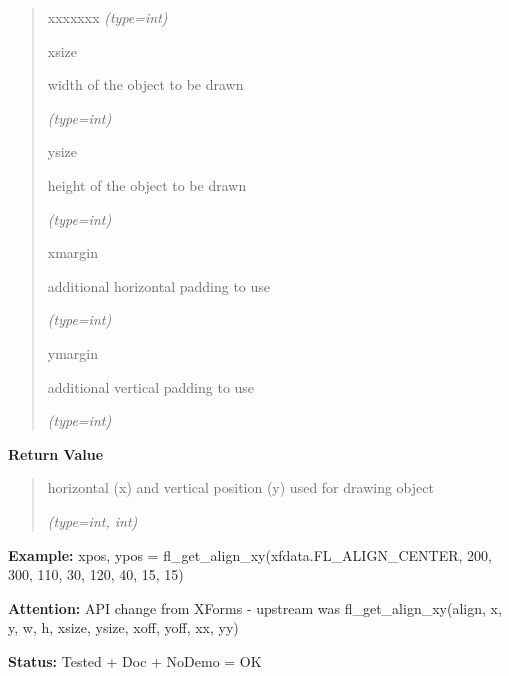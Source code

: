\begin{boxedminipage}{\funcwidth}
\begin{quote}
\begin{Ventry}{xxxxxxx}
            {\it (type=int)}

          \item[xsize]

          width of the object to be drawn

            {\it (type=int)}

          \item[ysize]

          height of the object to be drawn

            {\it (type=int)}

          \item[xmargin]

          additional horizontal padding to use

            {\it (type=int)}

          \item[ymargin]

          additional vertical padding to use

            {\it (type=int)}

        \end{Ventry}

      \end{quote}

      \textbf{Return Value}
    \vspace{-1ex}

      \begin{quote}
      horizontal (x) and vertical position (y) used for drawing object

      {\it (type=int, int)}

      \end{quote}

\textbf{Example:} xpos, ypos = fl\_get\_align\_xy(xfdata.FL\_ALIGN\_CENTER, 200, 300, 110, 
30, 120, 40, 15, 15)



\textbf{Attention:} API change from XForms - upstream was fl\_get\_align\_xy(align, x, y, w, h,
xsize, ysize, xoff, yoff, xx, yy)



\textbf{Status:} Tested + Doc + NoDemo = OK



    \end{boxedminipage}

    \label{xformslib:flbasic:fl_drw_text}

